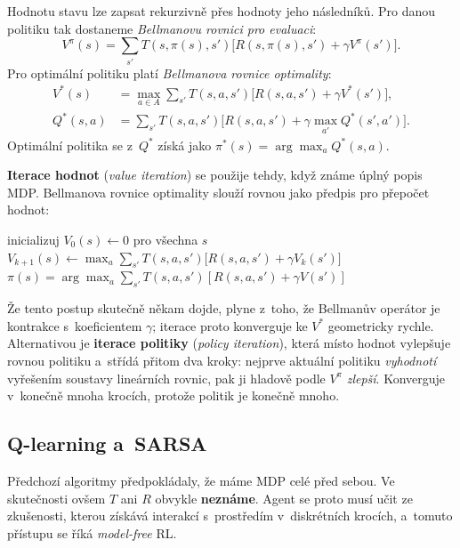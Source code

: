 \documentclass[11pt,a4paper]{article}
\theoremstyle{definition}
\begin{document}
\begin{defbox}
Hodnotu stavu lze zapsat rekurzivně přes hodnoty jeho následníků. Pro danou politiku tak
dostaneme \emph{Bellmanovu rovnici pro evaluaci}:
\[
V^\pi(s) = \sum_{s'} T(s,\pi(s),s') \big[ R(s,\pi(s),s') + \gamma V^\pi(s') \big].
\]
Pro optimální politiku platí \emph{Bellmanova rovnice optimality}:
\begin{align*}
V^*(s) &= \max_{a \in A} \sum_{s'} T(s,a,s') \big[ R(s,a,s') + \gamma V^*(s')\big], \\
Q^*(s,a) &= \sum_{s'} T(s,a,s')\big[R(s,a,s') + \gamma \max_{a'} Q^*(s',a')\big].
\end{align*}
Optimální politika se z~$Q^*$ získá jako $\pi^*(s) = \arg\max_a Q^*(s,a)$.
\end{defbox}

\noindent\textbf{Iterace hodnot} (\emph{value iteration}) se použije tehdy, když známe úplný
popis MDP. Bellmanova rovnice optimality slouží rovnou jako předpis pro přepočet hodnot:
\begin{algorithmic}[1]
\State inicializuj $V_0(s) \gets 0$ pro všechna $s$
\Repeat
    \State $V_{k+1}(s) \gets \max_{a} \sum_{s'} T(s,a,s')\big[R(s,a,s') + \gamma V_k(s')\big]$
  \EndFor
{}
\State \Return $\pi(s) = \arg\max_a \sum_{s'} T(s,a,s')[R(s,a,s') + \gamma V(s')]$
\end{algorithmic}
Že tento postup skutečně někam dojde, plyne z~toho, že Bellmanův operátor je kontrakce
s~koeficientem $\gamma$; iterace proto konverguje ke $V^*$ geometricky rychle. Alternativou
je \textbf{iterace politiky} (\emph{policy iteration}), která místo hodnot vylepšuje rovnou
politiku a~střídá přitom dva kroky: nejprve aktuální politiku \emph{vyhodnotí} vyřešením
soustavy lineárních rovnic, pak ji hladově podle $V^\pi$ \emph{zlepší}. Konverguje v~konečně
mnoha krocích, protože politik je konečně mnoho.

\subsection{Q-learning a~SARSA}

Předchozí algoritmy předpokládaly, že máme MDP celé před sebou. Ve skutečnosti ovšem $T$ ani
$R$ obvykle \textbf{neznáme}. Agent se proto musí učit ze zkušenosti, kterou získává interakcí
s~prostředím v~diskrétních krocích, a~tomuto přístupu se říká \emph{model-free} RL.
\end{document}

